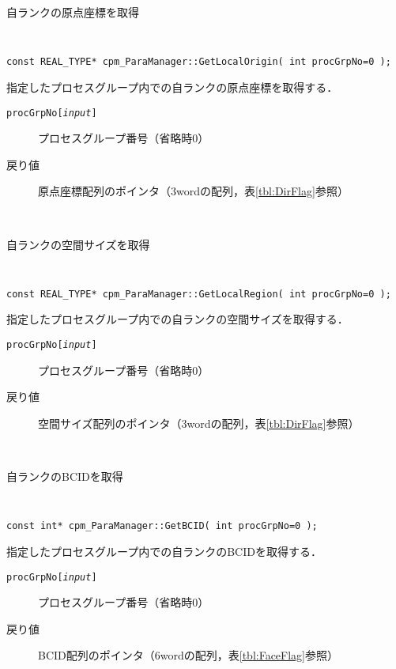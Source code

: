 \begin{spacing}{0.8}
\begin{itembox}[l]{自ランクの原点座標を取得}
{\tt
\begin{verbatim}
const REAL_TYPE* cpm_ParaManager::GetLocalOrigin( int procGrpNo=0 );
\end{verbatim}
}
指定したプロセスグループ内での自ランクの原点座標を取得する．
\begin{description}
\item[{\tt procGrpNo[{\it input}]}] プロセスグループ番号（省略時0）
\\
\item[戻り値]原点座標配列のポインタ（3wordの配列，表\ref{tbl:DirFlag}参照）
\end{description}
\end{itembox}\\
\end{spacing}

\begin{spacing}{0.8}
\begin{itembox}[l]{自ランクの空間サイズを取得}
{\tt
\begin{verbatim}
const REAL_TYPE* cpm_ParaManager::GetLocalRegion( int procGrpNo=0 );
\end{verbatim}
}
指定したプロセスグループ内での自ランクの空間サイズを取得する．
\begin{description}
\item[{\tt procGrpNo[{\it input}]}] プロセスグループ番号（省略時0）
\\
\item[戻り値]空間サイズ配列のポインタ（3wordの配列，表\ref{tbl:DirFlag}参照）
\end{description}
\end{itembox}\\
\end{spacing}

\begin{spacing}{0.8}
\begin{itembox}[l]{自ランクのBCIDを取得}
{\tt
\begin{verbatim}
const int* cpm_ParaManager::GetBCID( int procGrpNo=0 );
\end{verbatim}
}
指定したプロセスグループ内での自ランクのBCIDを取得する．
\begin{description}
\item[{\tt procGrpNo[{\it input}]}] プロセスグループ番号（省略時0）
\\
\item[戻り値]BCID配列のポインタ（6wordの配列，表\ref{tbl:FaceFlag}参照）
\end{description}
\end{itembox}\\
\end{spacing}

